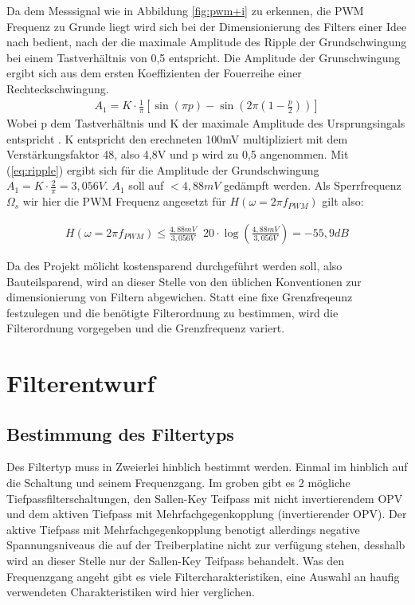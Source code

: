 \documentclass[11pt,twoside,a4paper,openright]{mpreport}
\begin{document}
Da dem Messsignal wie in Abbildung \ref{fig:pwm+i} zu erkennen, die PWM Frequenz zu Grunde liegt wird sich bei der Dimensionierung des Filters einer Idee nach \cite{Alter2008} bedient, nach der die maximale Amplitude des Ripple der Grundschwingung bei einem
Tastverhältnis von 0,5 entspricht. Die Amplitude der Grunschwingung ergibt sich aus dem ersten Koeffizienten der Fouerreihe einer Rechteckschwingung.
\begin{align}
A_1 = K\cdot \frac{1}{\pi}[\sin(\pi p)-\sin(2\pi(1-\frac{p}{2}))]
\label{eq:ripple}
\end{align}
Wobei p dem Tastverhältnis und K der maximale Amplitude des Ursprungsingals entspricht \cite{Alter2008}. K entspricht den erechneten 100mV multipliziert mit dem Verstärkungsfaktor 48, also 4,8V und p wird zu 0,5
angenommen. Mit (\ref{eq:ripple}) ergibt sich für die Amplitude der Grundschwingung $ A_1 = K\cdot \frac{2}{\pi} = 3,056V$. $A_1$ soll auf $ < 4,88mV$ gedämpft werden.
Als Sperrfrequenz $\Omega_s $ wir hier die PWM Frequenz angesetzt für $H(\omega=2\pi f_{PWM})$ gilt also:

\begin{align}
H(\omega=2\pi f_{PWM}) \le \frac{4,88mV}{3,056V} \mathop{\hat{=}} 20\cdot\log(\frac{4,88mV}{3,056V})= -55,9 dB
\label{eq:daempfung}
\end{align}

Da des Projekt mölicht kostensparend durchgeführt werden soll, also Bauteilsparend, wird an dieser Stelle von den üblichen Konventionen zur dimensionierung von Filtern abgewichen.
Statt eine fixe Grenzfreqeunz festzulegen und die benötigte Filterordnung zu bestimmen, wird die Filterordnung vorgegeben und die Grenzfrequenz variert.

\section{Filterentwurf}

\subsection{Bestimmung des Filtertyps}

Des Filtertyp muss in Zweierlei hinblich bestimmt werden. Einmal im hinblich auf die Schaltung und seinem Frequenzgang.
Im groben gibt es 2 mögliche Tiefpassfilterschaltungen, den Sallen-Key Teifpass mit nicht invertierendem OPV und dem aktiven Tiefpass mit Mehrfachgegenkopplung 
(invertierender OPV). Der aktive Tiefpass mit Mehrfachgegenkopplung benotigt allerdings negative Spannungsniveaus die auf der Treiberplatine nicht zur
verfügung stehen, desshalb wird an dieser Stelle nur der Sallen-Key Teifpass behandelt.
Was den Frequenzgang angeht gibt es viele Filtercharakteristiken, eine Auswahl an haufig verwendeten Charakteristiken wird hier verglichen.
\end{document}
